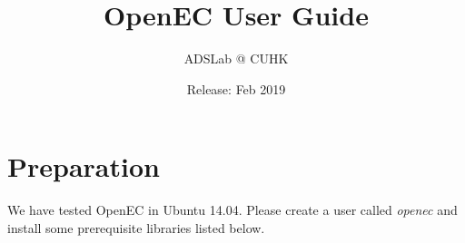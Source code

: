 \documentclass[letterpaper,12pt]{article}
\title{{\bf OpenEC User Guide}}
\author{ADSLab @ CUHK}
\date{Release: Feb 2019\\}
\newcommand{\openec}{{\sf\small OpenEC}\xspace}
\begin{document}
\maketitle


\tableofcontents

\clearpage

\section{Preparation}
\label{sec:installation}

We have tested \openec in Ubuntu 14.04. Please create a user called {\sl openec} and
install some prerequisite libraries listed below.
\end{document}
